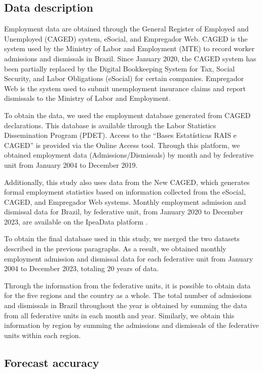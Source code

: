 \documentclass[a4paper,preprint,11pt,authoryear]{elsarticle}
\begin{document}
\subsection{Data description}
\label{sec4.1}

Employment data are obtained through the General Register of Employed and Unemployed (CAGED) system, eSocial, and Empregador Web. CAGED is the system used by the Ministry of Labor and Employment (MTE) to record worker admissions and dismissals in Brazil. Since January 2020, the CAGED system has been partially replaced by the Digital Bookkeeping System for Tax, Social Security, and Labor Obligations (eSocial) for certain companies. Empregador Web is the system used to submit unemployment insurance claims and report dismissals to the Ministry of Labor and Employment.

To obtain the data, we used the employment database generated from CAGED declarations. This database is available through the Labor Statistics Dissemination Program (PDET). Access to the ``Bases Estatísticas RAIS e CAGED'' is provided via the Online Access tool. Through this platform, we obtained employment data (Admissions/Dismissals) by month and by federative unit from January 2004 to December 2019.

Additionally, this study also uses data from the New CAGED, which generates formal employment statistics based on information collected from the eSocial, CAGED, and Empregador Web systems. Monthly employment admission and dismissal data for Brazil, by federative unit, from January 2020 to December 2023, are available on the IpeaData platform \citep{ipeadata}.

To obtain the final database used in this study, we merged the two datasets described in the previous paragraphs. As a result, we obtained monthly employment admission and dismissal data for each federative unit from January 2004 to December 2023, totaling 20 years of data.

Through the information from the federative units, it is possible to obtain data for the five regions and the country as a whole. The total number of admissions and dismissals in Brazil throughout the year is obtained by summing the data from all federative units in each month and year. Similarly, we obtain this information by region by summing the admissions and dismissals of the federative units within each region.

\subsection{Forecast accuracy}
\label{sec4.2}
\end{document}
